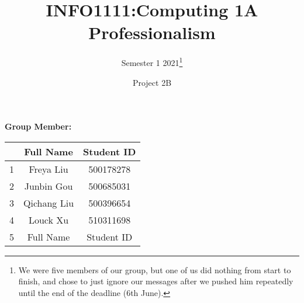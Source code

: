 \documentclass{article}
\title{INFO1111:Computing 1A Professionalism}
\author{Semester 1 2021\thanks{We were five members of our group, but one of us did nothing from start to finish, and chose to just ignore our messages after we pushed him repeatedly until the end of the deadline (6th June).}}
\date{Project 2B}
\begin{document}
	
	
	\begin{titlepage}
		\maketitle
		\begin{title}
			\begin{center}
				\textbf{Group Member:}
			\end{center}
		\end{title}
		\begin{center}
			
			\begin{tabular}{|c|c|c|}
				\hline &Full Name& Student ID\\
				\hline 1& Freya Liu & 500178278  \\
				\hline 2& Junbin Gou & 500685031  \\
				\hline 3& Qichang Liu & 500396654 \\
				\hline 4& Louck Xu & 510311698  \\
				\hline 5&Full Name& Student ID  \\
				\hline
			\end{tabular}
		\end{center}
	\end{titlepage}
	
\end{document}
